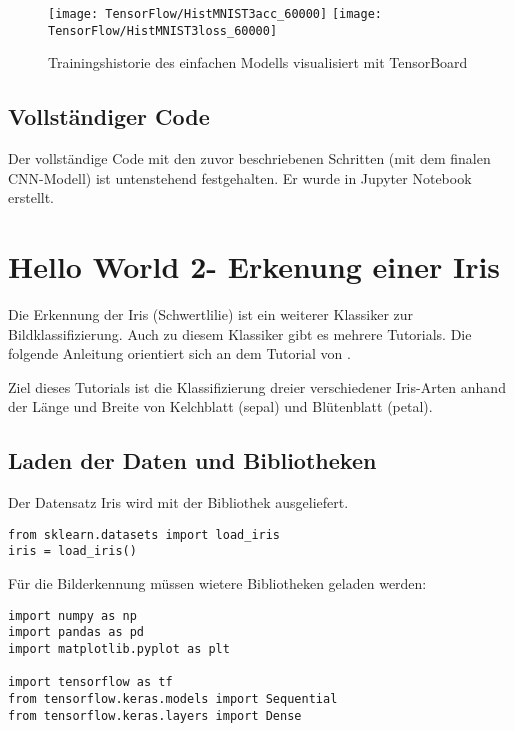 \begin{figure}[H]
	\begin{center}
		\texttt{[image: TensorFlow/HistMNIST3acc\_60000]}
		\texttt{[image: TensorFlow/HistMNIST3loss\_60000]}
		\caption{Trainingshistorie des einfachen Modells visualisiert mit TensorBoard} 
		\label{HistMNIST3_60000}
	\end{center}
\end{figure}

\subsection{Vollständiger Code}
Der vollständige Code mit den zuvor beschriebenen Schritten (mit dem finalen CNN-Modell) ist untenstehend festgehalten.
Er wurde in Jupyter Notebook erstellt.


%



\section{\glqq Hello World 2\grqq - Erkenung einer Iris}

Die Erkennung der Iris (Schwertlilie) ist ein weiterer Klassiker zur Bildklassifizierung. Auch zu diesem Klassiker gibt es mehrere Tutorials.
Die folgende Anleitung orientiert sich an dem Tutorial von \cite{KDnuggets.07.12.2020}.

Ziel dieses Tutorials ist die Klassifizierung dreier verschiedener Iris-Arten anhand der Länge und Breite von Kelchblatt (sepal) und Blütenblatt (petal).

\subsection{Laden der Daten und Bibliotheken}
Der Datensatz \glqq Iris\grqq{} wird mit der Bibliothek  ausgeliefert.

\begin{verbatim}
from sklearn.datasets import load_iris
iris = load_iris()
\end{verbatim}

Für die Bilderkennung müssen wietere Bibliotheken geladen werden:

\begin{verbatim}
import numpy as np
import pandas as pd
import matplotlib.pyplot as plt

import tensorflow as tf
from tensorflow.keras.models import Sequential
from tensorflow.keras.layers import Dense
\end{verbatim}


